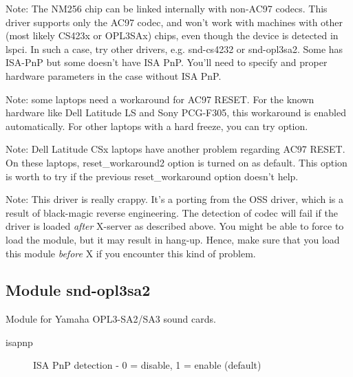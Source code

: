 \documentclass[a4paper,8pt,english]{sphinxmanual}
\begin{document}
Note: The NM256 chip can be linked internally with non-AC97
codecs.  This driver supports only the AC97 codec, and won't work
with machines with other (most likely CS423x or OPL3SAx) chips,
even though the device is detected in lspci.  In such a case, try
other drivers, e.g. snd-cs4232 or snd-opl3sa2.  Some has ISA-PnP
but some doesn't have ISA PnP.  You'll need to specify 
and proper hardware parameters in the case without ISA PnP.

Note: some laptops need a workaround for AC97 RESET.  For the
known hardware like Dell Latitude LS and Sony PCG-F305, this
workaround is enabled automatically.  For other laptops with a
hard freeze, you can try  option.

Note: Dell Latitude CSx laptops have another problem regarding
AC97 RESET.  On these laptops, reset\_workaround2 option is
turned on as default.  This option is worth to try if the
previous reset\_workaround option doesn't help.

Note: This driver is really crappy.  It's a porting from the
OSS driver, which is a result of black-magic reverse engineering.
The detection of codec will fail if the driver is loaded \emph{after}
X-server as described above.  You might be able to force to load
the module, but it may result in hang-up.   Hence, make sure that
you load this module \emph{before} X if you encounter this kind of
problem.


\subsection{Module snd-opl3sa2}
\label{sound/alsa-configuration:module-snd-opl3sa2}
Module for Yamaha OPL3-SA2/SA3 sound cards.
\begin{description}
\item[{isapnp}] \leavevmode
ISA PnP detection - 0 = disable, 1 = enable (default)

\end{description}
\end{document}
